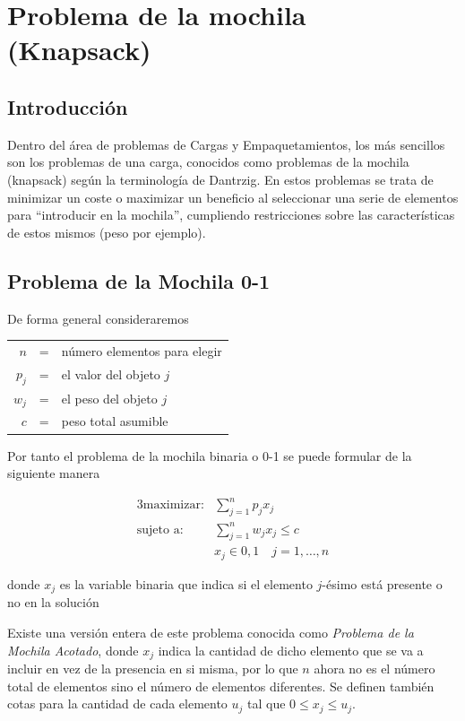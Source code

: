 \section{Problema de la mochila (Knapsack)}

\subsection{Introducción}

Dentro del área de problemas de Cargas y Empaquetamientos, los más sencillos son los problemas de una carga, conocidos
como problemas de la mochila (knapsack) según la terminología de Dantrzig. En estos problemas se trata de minimizar un coste
o maximizar un beneficio al seleccionar una serie de elementos para ``introducir en la mochila'', cumpliendo restricciones
sobre las características de estos mismos (peso por ejemplo).

\subsection{Problema de la Mochila 0-1}

De forma general consideraremos

\begin{center}
    \begin{tabular}{rcl}
        $n$   & = & número elementos para elegir \\
        $p_j$ & = & el valor del objeto $j$ \\
        $w_j$ & = & el peso del objeto $j$ \\
        $c$   & = & peso total asumible
    \end{tabular}
\end{center}

\noindent Por tanto el problema de la mochila binaria o 0-1 se puede formular de la siguiente manera

\begin{alignat}{3}
    \text{maximizar:}   &   \sum_{j=1}^n p_jx_j       \\
    \text{sujeto a:}    &   \sum_{j=1}^n w_jx_j\leq c \\
                        &   x_j \in {0, 1} \quad j=1,\dots,n
\end{alignat}

\noindent donde $x_j$ es la variable binaria que indica si el elemento $j$-ésimo está presente o no en la solución

Existe una versión entera de este problema conocida como \textit{Problema de la Mochila Acotado}, donde $x_j$ indica la
cantidad de dicho elemento que se va a incluir en vez de la presencia en si misma, por lo que $n$ ahora no es el número
total de elementos sino el número de elementos diferentes. Se definen también cotas para la cantidad de cada elemento $u_j$
tal que $0\leq x_j\leq u_j$.

